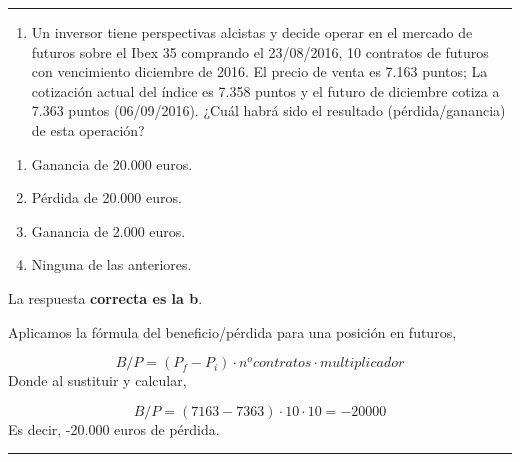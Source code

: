 \documentclass[
  letterpaper,
  DIV=11,
  numbers=noendperiod]{scrreprt}
\providecommand{\tightlist}{%
  \setlength{\itemsep}{0pt}\setlength{\parskip}{0pt}}\usepackage{longtable,booktabs,array}
\begin{document}
\begin{center}\rule{0.5\linewidth}{0.5pt}\end{center}

\begin{enumerate}
\def\labelenumi{\arabic{enumi}.}
\setcounter{enumi}{53}
\tightlist
\item
  Un inversor tiene perspectivas alcistas y decide operar en el mercado
  de futuros sobre el Ibex 35 comprando el 23/08/2016, 10 contratos de
  futuros con vencimiento diciembre de 2016. El precio de venta es 7.163
  puntos; La cotización actual del índice es 7.358 puntos y el futuro de
  diciembre cotiza a 7.363 puntos (06/09/2016). ¿Cuál habrá sido el
  resultado (pérdida/ganancia) de esta operación?
\end{enumerate}

\begin{enumerate}
\def\labelenumi{\alph{enumi})}
\item
  Ganancia de 20.000 euros.
\item
  Pérdida de 20.000 euros.
\item
  Ganancia de 2.000 euros.
\item
  Ninguna de las anteriores.
\end{enumerate}

\begin{tcolorbox}[enhanced jigsaw, left=2mm, opacityback=0, colback=white, breakable, arc=.35mm, bottomrule=.15mm, rightrule=.15mm, toprule=.15mm, leftrule=.75mm, colframe=quarto-callout-tip-color-frame]
\begin{minipage}[t]{5.5mm}
\textcolor{quarto-callout-tip-color}{\faLightbulb}
\end{minipage}%
\begin{minipage}[t]{\textwidth - 5.5mm}

La respuesta \textbf{correcta es la b}.

Aplicamos la fórmula del beneficio/pérdida para una posición en futuros,

\[B/P=(P_f-P_i)\cdot n^o contratos\cdot multiplicador\] Donde al
sustituir y calcular,

\[B/P=(7163-7363)\cdot 10\cdot 10=-20000\] Es decir, -20.000 euros de
pérdida.

\end{minipage}%
\end{tcolorbox}

\begin{center}\rule{0.5\linewidth}{0.5pt}\end{center}
\end{document}
